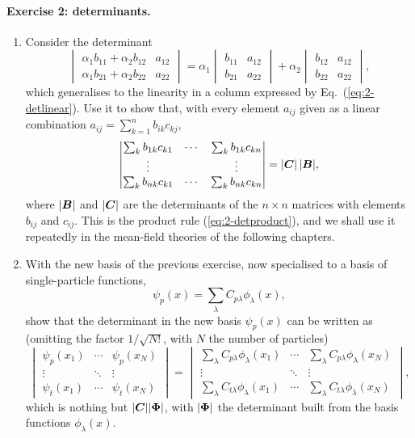 \paragraph{Exercise 2: determinants.}
\begin{enumerate}
  \item[a)] Consider the determinant
  \[
    \begin{vmatrix}
      \alpha_1 b_{11}+\alpha_2 b_{12} & a_{12}\\
      \alpha_1 b_{21}+\alpha_2 b_{22} & a_{22}
    \end{vmatrix}
    = \alpha_1\begin{vmatrix} b_{11} & a_{12}\\ b_{21} & a_{22}\end{vmatrix}
    + \alpha_2\begin{vmatrix} b_{12} & a_{12}\\ b_{22} & a_{22}\end{vmatrix},
  \]
  which generalises to the linearity in a column expressed by
  Eq.~(\ref{eq:2-detlinear}).  Use it to show that, with every element
  $a_{ij}$ given as a linear combination
  $a_{ij}=\sum_{k=1}^{n}b_{ik}c_{kj}$,
  \[
    \begin{vmatrix}
      \sum_k b_{1k}c_{k1} & \cdots & \sum_k b_{1k}c_{kn}\\
      \vdots & & \vdots\\
      \sum_k b_{nk}c_{k1} & \cdots & \sum_k b_{nk}c_{kn}
    \end{vmatrix}
    = {|\boldsymbol{C}|}\,{|\boldsymbol{B}|},
  \]
  where ${|\boldsymbol{B}|}$ and ${|\boldsymbol{C}|}$ are the determinants of the $n\times n$
  matrices with elements $b_{ij}$ and $c_{ij}$.  This is the product rule
  (\ref{eq:2-detproduct}), and we shall use it repeatedly in the mean-field
  theories of the following chapters.

  \item[b)] With the new basis of the previous exercise, now specialised to a
  basis of single-particle functions,
  \[
    \psi_p(x) = \sum_{\lambda}C_{p\lambda}\phi_{\lambda}(x),
  \]
  show that the determinant in the new basis $\psi_p(x)$ can be written as
  (omitting the factor $1/\sqrt{N!}$, with $N$ the number of particles)
  \[
    \begin{vmatrix}
      \psi_p(x_1) & \cdots & \psi_p(x_N)\\
      \vdots & \ddots & \vdots\\
      \psi_t(x_1) & \cdots & \psi_t(x_N)
    \end{vmatrix}
    =
    \begin{vmatrix}
      \sum_\lambda C_{p\lambda}\phi_\lambda(x_1) & \cdots &
      \sum_\lambda C_{p\lambda}\phi_\lambda(x_N)\\
      \vdots & \ddots & \vdots\\
      \sum_\lambda C_{t\lambda}\phi_\lambda(x_1) & \cdots &
      \sum_\lambda C_{t\lambda}\phi_\lambda(x_N)
    \end{vmatrix},
  \]
  which is nothing but ${|\boldsymbol{C}|}{|\boldsymbol{\Phi}|}$, with ${|\boldsymbol{\Phi}|}$ the determinant
  built from the basis functions $\phi_{\lambda}(x)$.


\end{enumerate}

